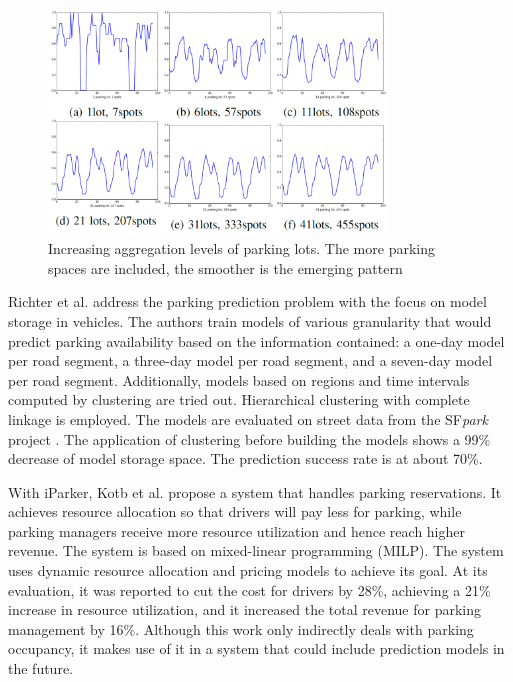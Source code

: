 \begin{figure}[!ht]
	\centering
	\includegraphics[width=0.8\textwidth]{graphics/related_work/xchen_1.png}
	\caption{Increasing aggregation levels of parking lots. The more parking spaces are included, the smoother is the emerging pattern } %
	\label{fig:related_work_xchen}
\end{figure}

Richter et al. \cite{richter} address the parking prediction problem with the focus on model storage in vehicles. The authors train models of various granularity that would predict parking availability based on the information contained: a one-day model per road segment, a three-day model per road segment, and a seven-day model per road segment. Additionally, models based on regions and time intervals computed by clustering are tried out. Hierarchical clustering with complete linkage is employed. The models are evaluated on street data from the SF\textit{park} project \cite{sfpark_open_data}. The application of clustering before building the models shows a 99\% decrease of model storage space. The prediction success rate is at about 70\%.

With iParker, Kotb et al. \cite{kotb} propose a system that handles parking reservations. It achieves resource allocation so that drivers will pay less for parking, while parking managers receive more resource utilization and hence reach higher revenue. The system is based on mixed-linear programming (MILP). The system uses dynamic resource allocation and pricing models to achieve its goal. At its evaluation, it was reported to cut the cost for drivers by 28\%, achieving a 21\% increase in resource utilization, and it increased the total revenue for parking management by 16\%. Although this work only indirectly deals with parking occupancy, it makes use of it in a system that could include prediction models in the future.

